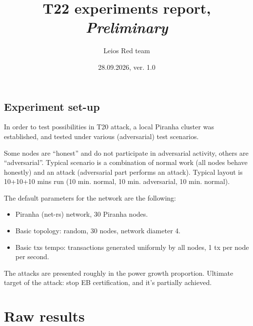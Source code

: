 \documentclass[10pt, a4paper]{article}
\title{T22 experiments report, \textit{Preliminary}}
\author{Leios Red team}
\date{28.09.2026, ver. 1.0}
\begin{document}
\maketitle

\subsection*{Experiment set-up}

In order to test possibilities in T20 attack, a local Piranha cluster was 
established, and tested under various (adversarial) test scenarios.

Some nodes are ``honest'' and do not participate in adversarial activity,
others are ``adversarial''. Typical scenario is a combination of normal work 
(all nodes behave honestly) and an attack (adversarial part performs an attack).
Typical layout is 10+10+10 mins run (10 min. normal, 10 min. 
adversarial, 10 min. normal).

The default parameters for the network are the following:

\begin{itemize}
\item Piranha (net-rs) network, 30 Piranha nodes.
\item Basic topology: random, 30 nodes, network diameter 4.
\item Basic txs tempo: transactions generated uniformly by all nodes,
1 tx per node per second.
\end{itemize}

The attacks are presented roughly in the power growth proportion. 
Ultimate target of the attack: stop EB certification, and it's partially 
achieved.


\section*{Raw results}
\end{document}
